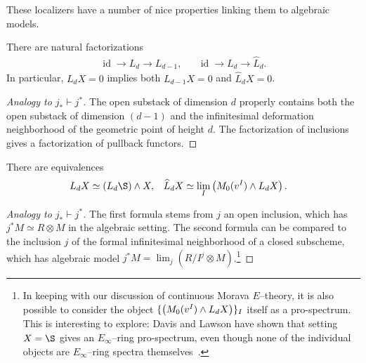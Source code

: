 These localizers have a number of nice properties linking them to algebraic models.

\begin{lemma}
There are natural factorizations
\begin{align*}
\operatorname{id} \to L_d \to L_{d-1}, & & \operatorname{id} \to L_d \to \widehat L_d.
\end{align*}
In particular, \(L_d X = 0\) implies both \(L_{d-1} X = 0\) and \(\widehat L_d X = 0\).
\end{lemma}
\begin{proof}[Analogy to \(j_* \vdash j^*\)]
The open substack of dimension \(d\) properly contains both the open substack of dimension \((d-1)\) and the infinitesimal deformation neighborhood of the geometric point of height \(d\).  The factorization of inclusions gives a factorization of pullback functors.
\end{proof}

\begin{lemma}\label{FormulaForKnLocalization}
There are equivalences
\begin{align*}
L_d X & \simeq (L_d \S) \sm X, &
\widehat L_d X & \simeq \lim_I \left( M_0(v^I) \sm L_d X \right).
\end{align*}
\end{lemma}
\begin{proof}[Analogy to \(j_* \vdash j^*\)]
The first formula stems from \(j\) an open inclusion, which has \(j^* M \simeq R \otimes M\) in the algebraic setting.  The second formula can be compared to the inclusion \(j\) of the formal infinitesimal neighborhood of a closed subscheme, which has algebraic model \(j^* M = \lim_j (R/I^j \otimes M)\).\footnote{In keeping with our discussion of continuous Morava \(E\)--theory, it is also possible to consider the object \(\{\left( M_0(v^I) \wedge L_d X \right)\}_I\) itself as a pro-spectrum.  This is interesting to explore: Davis and Lawson have shown that setting \(X = \S\) gives an \(E_\infty\)--ring pro-spectrum, even though none of the individual objects are \(E_\infty\)--ring spectra themselves~\cite{DavisLawson}.}
\end{proof}


